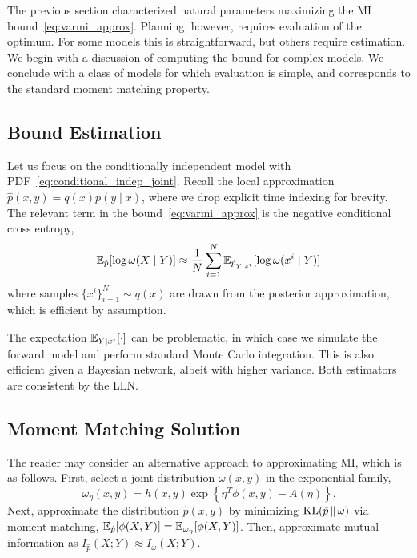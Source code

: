 The previous section characterized natural parameters maximizing the
MI bound~\eqref{eq:varmi_approx}.  Planning, however, requires
evaluation of the optimum.  For some models this is straightforward,
but others require estimation.  We begin with a discussion of
computing the bound for complex models.  We conclude with a class of
models for which evaluation is simple, and corresponds to the
standard moment matching property.

\subsection{Bound Estimation}


Let us focus on the conditionally independent model with
PDF~\eqref{eq:conditional_indep_joint}.  Recall the local
approximation $\hat{p}(x,y) = q(x)p(y\mid x)$, where we drop explicit
time indexing for brevity.  The relevant term
in the bound~\eqref{eq:varmi_approx} is the negative conditional cross
entropy,
\begin{equation}
  \mathbb{E}_{\hat{p}}[ \log \omega(X \mid Y)
  ] \approx \frac{1}{N} \sum_{i=1}^N \mathbb{E}_{\hat{p}_{Y \mid
    x^i}}[ \log \omega(x^i \mid Y) ]
\end{equation}
where samples $\{x^i\}_{i=1}^N \sim q(x)$ are drawn from the posterior
approximation, which is efficient by assumption.

The expectation $\mathbb{E}_{Y\mid x^i}[\cdot]$ can be problematic, in which
case we simulate the forward model and perform standard Monte Carlo
integration.  This is also efficient given a Bayesian network, albeit
with higher variance.  Both estimators are consistent by the LLN.


\subsection{Moment Matching Solution}\label{sec:moment_match}

The reader may consider an alternative approach to approximating MI,
which is as follows.  First, select a joint distribution $\omega(x,y)$
in the exponential family,
\[
  \omega_{\eta}(x,y) = h(x,y)\exp\left\{ \eta^T \phi(x,y) - A(\eta)
    \right\}.
\]
Next, approximate the distribution $\hat{p}(x,y)$ by minimizing
$\mathrm{KL}(\hat{p}\,\|\,\omega)$ via moment matching, \mbox{$\mathbb{E}_{\hat{p}}[ \phi(X,Y) ]
= \mathbb{E}_{\omega_{\eta}}[ \phi(X,Y) ]$}.  Then, approximate
mutual information as $I_{\hat{p}}(X;Y) \approx I_{\omega}(X;Y)$.

